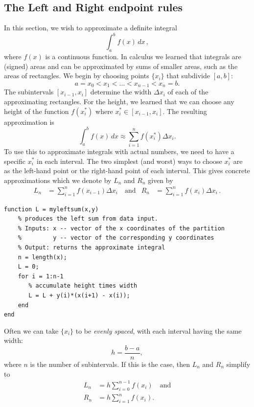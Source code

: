 
\subsection*{The Left and Right endpoint rules}

In this section, we wish to approximate a definite integral
$$
\int_a^b f(x) \, dx
\,,
$$
where $f(x)$ is a continuous function.
In calculus we learned that integrals are (signed) areas and can be approximated
by sums of smaller areas, such as the areas of rectangles.
We begin by choosing points $\{x_i\}$  that subdivide $[a,b]$:
$$
a = x_0 < x_1 < \ldots < x_{n-1} < x_n = b.
$$
The subintervals $[x_{i-1}, x_i]$ determine the width $\Delta x_i$ of
each of the approximating
rectangles. For the height, we learned that we can choose any height
of the function $f(x^*_i)$ where $x^*_i \in [x_{i-1},x_i]$. The
resulting approximation is
$$
  \int_a^b f(x) \, dx \approx \sum_{i=1}^n f(x^*_i) \Delta x_i.
$$
To use this to approximate integrals with actual numbers, we
need to have a specific $x^*_i$ in each interval. The two simplest
(and worst) ways to choose $x^*_i$ are as the left-hand point or the
right-hand point of each interval. This gives concrete approximations
which we denote by $L_n$ and $R_n$ given by
\begin{align*}
L_n &= \sum_{i=1}^n f(x_{i-1}) \Delta x_i
\quad\text{and}&
R_n &= \sum_{i=1}^n f(x_i) \Delta x_i
\,.
\end{align*}
\begin{lstlisting}
function L = myleftsum(x,y)
    % produces the left sum from data input.
    % Inputs: x -- vector of the x coordinates of the partition
    %         y -- vector of the corresponding y coordinates
    % Output: returns the approximate integral
    n = length(x);
    L = 0;
    for i = 1:n-1
       % accumulate height times width
       L = L + y(i)*(x(i+1) - x(i));
    end
end
\end{lstlisting}


Often we can take $\{x_i\}$ to be {\em evenly spaced}, with each
interval having the same width:
$$
 h   = \frac{b-a}{n} ,
$$
where $n$ is the number of subintervals. If this is the case, then $L_n$
and $R_n$ simplify to
\begin{align}
\label{evenleft}
L_n  &= h \sum_{i=0}^{n-1} f(x_i)
\quad\text{and}\\
\label{evenright}
R_n &= h \sum_{i=1}^n f(x_i).
\end{align}


